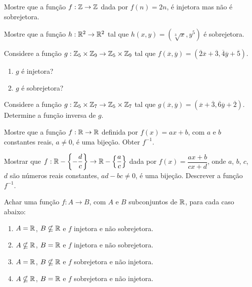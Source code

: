 \documentclass[12pt]{exam}
\begin{document}
\vspace{.3cm}

\questao{} Mostre que a fun\c{c}\~ao $f : \mathbb{Z} \to \mathbb{Z}$ dada por $f(n) = 2n$, \'e injetora mas n\~ao \'e sobrejetora.

\vspace{.3cm}

\questao{} Mostre que a fun\c{c}\~ao $h : \mathbb{R}^2 \to \mathbb{R}^2$ tal que $h(x, y) = (\sqrt[3]{x}, y^5)$ \'e sobrejetora.
\vspace{.3cm}

\questao{} Considere a fun{\c c}{\~a}o $g : \mathbb{Z}_5 \times \mathbb{Z}_9 \to \mathbb{Z}_5 \times \mathbb{Z}_9$ tal que $f(\overline{x},\overline{y}) = (\overline{2} \overline{x} + \overline{3}, \overline{4}\overline{y} + \overline{5})$.
\begin{enumerate}[label={\alph*})]
	\item $g$ \'e injetora?
	\item $g$ \'e sobrejetora?
\end{enumerate}

\vspace{.3cm}

\questao{} Considere a fun{\c c}{\~a}o $g : \mathbb{Z}_5 \times \mathbb{Z}_7 \to \mathbb{Z}_5 \times \mathbb{Z}_7$ tal que $g(\overline{x},\overline{y}) = (\overline{x} + \overline{3}, \overline{6}\overline{y} + \overline{2})$. Determine a fun\c{c}\~ao inversa de $g$.

\vspace{.3cm}

\questao{} Mostre que a fun{\c c}{\~a}o $f : \mathbb{R} \to \mathbb{R}$ definida por $f(x) = ax + b$, com $a$ e $b$ constantes reais, $a \ne 0$, {\'e} uma bije{\c c}{\~a}o. Obter $f^{-1}$.

\vspace{.3cm}

\questao{} Mostrar que $f : \mathbb{R} - \left\{-\dfrac{d}{c}\right\} \to \mathbb{R}  - \left\{\dfrac{a}{c}\right\}$ dada por $f(x) =  \dfrac{ax + b}{cx + d}$, onde $a$, $b$, $c$, $d$ s{\~a}o n{\'u}meros reais constantes, $ad - bc \ne 0$, {\'e} uma bije{\c c}{\~a}o. Descrever a fun{\c c}{\~a}o $f^{-1}$.

\vspace{.3cm}

\questao{} Achar uma fun{\c c}{\~a}o $f : A \to B$, com $A$ e $B$ subconjuntos de $\mathbb{R}$, para cada caso abaixo:
\begin{enumerate}[label={\alph*})]
	\item $A = \mathbb{R}$, $B \nsubseteq \mathbb{R}$ e $f$ injetora e n{\~a}o sobrejetora.
	\item $A \nsubseteq \mathbb{R}$, $B = \mathbb{R}$ e $f$ injetora e n{\~a}o sobrejetora.
	\item $A = \mathbb{R}$, $B \nsubseteq \mathbb{R}$ e $f$ sobrejetora e n{\~a}o injetora.
	\item $A \nsubseteq \mathbb{R}$, $B = \mathbb{R}$ e $f$ sobrejetora e n{\~a}o injetora.
\end{enumerate}
\end{document}
